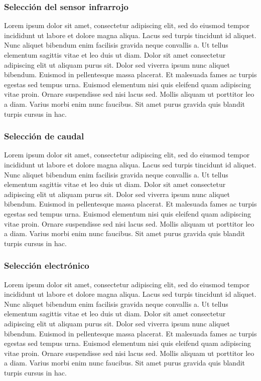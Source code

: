 \subsubsection{Selección del sensor infrarrojo}

Lorem ipsum dolor sit amet, consectetur adipiscing elit, sed do eiusmod tempor incididunt ut labore et dolore magna aliqua. Lacus sed turpis tincidunt id aliquet. Nunc aliquet bibendum enim facilisis gravida neque convallis a. Ut tellus elementum sagittis vitae et leo duis ut diam. Dolor sit amet consectetur adipiscing elit ut aliquam purus sit. Dolor sed viverra ipsum nunc aliquet bibendum. Euismod in pellentesque massa placerat. Et malesuada fames ac turpis egestas sed tempus urna. Euismod elementum nisi quis eleifend quam adipiscing vitae proin. Ornare suspendisse sed nisi lacus sed. Mollis aliquam ut porttitor leo a diam. Varius morbi enim nunc faucibus. Sit amet purus gravida quis blandit turpis cursus in hac.

\subsubsection{Selección de caudal} 

Lorem ipsum dolor sit amet, consectetur adipiscing elit, sed do eiusmod tempor incididunt ut labore et dolore magna aliqua. Lacus sed turpis tincidunt id aliquet. Nunc aliquet bibendum enim facilisis gravida neque convallis a. Ut tellus elementum sagittis vitae et leo duis ut diam. Dolor sit amet consectetur adipiscing elit ut aliquam purus sit. Dolor sed viverra ipsum nunc aliquet bibendum. Euismod in pellentesque massa placerat. Et malesuada fames ac turpis egestas sed tempus urna. Euismod elementum nisi quis eleifend quam adipiscing vitae proin. Ornare suspendisse sed nisi lacus sed. Mollis aliquam ut porttitor leo a diam. Varius morbi enim nunc faucibus. Sit amet purus gravida quis blandit turpis cursus in hac.

\subsubsection{Selección electrónico} 

Lorem ipsum dolor sit amet, consectetur adipiscing elit, sed do eiusmod tempor incididunt ut labore et dolore magna aliqua. Lacus sed turpis tincidunt id aliquet. Nunc aliquet bibendum enim facilisis gravida neque convallis a. Ut tellus elementum sagittis vitae et leo duis ut diam. Dolor sit amet consectetur adipiscing elit ut aliquam purus sit. Dolor sed viverra ipsum nunc aliquet bibendum. Euismod in pellentesque massa placerat. Et malesuada fames ac turpis egestas sed tempus urna. Euismod elementum nisi quis eleifend quam adipiscing vitae proin. Ornare suspendisse sed nisi lacus sed. Mollis aliquam ut porttitor leo a diam. Varius morbi enim nunc faucibus. Sit amet purus gravida quis blandit turpis cursus in hac.

